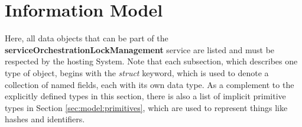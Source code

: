 \documentclass[a4paper]{arrowhead}
\begin{document}
\clearpage

\section{Information Model}
\label{sec:model}

Here, all data objects that can be part of the \textbf{serviceOrchestrationLockManagement} service are listed and must be respected by the hosting System.
Note that each subsection, which describes one type of object, begins with the \textit{struct} keyword, which is used to denote a collection of named fields, each with its own data type.
As a complement to the explicitly defined types in this section, there is also a list of implicit primitive types in Section \ref{sec:model:primitives}, which are used to represent things like hashes and identifiers.


\end{document}
